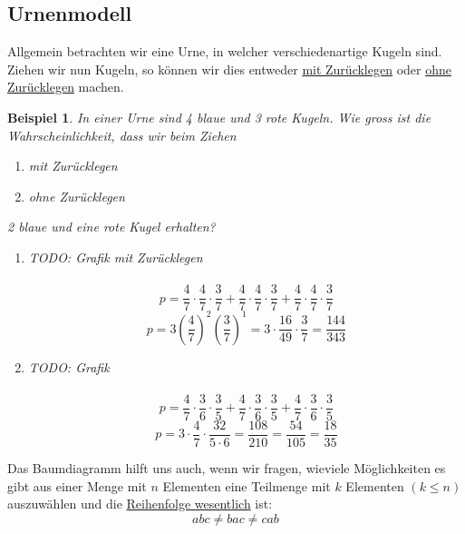 \documentclass{report}
\newtheorem{myexample}{Beispiel}
\begin{document}
\subsection{Urnenmodell}
Allgemein betrachten wir eine Urne, in welcher verschiedenartige Kugeln sind. Ziehen wir nun Kugeln, so können wir dies entweder \underline{mit Zurücklegen} oder \underline{ohne Zurücklegen} machen.
\begin{myexample}
In einer Urne sind 4 blaue und 3 rote Kugeln. Wie gross ist die Wahrscheinlichkeit, dass wir beim Ziehen
\begin{enumerate}
\item
mit Zurücklegen
\item
ohne Zurücklegen
\end{enumerate}
2 blaue und eine rote Kugel erhalten?
\begin{enumerate}
\item
TODO: Grafik mit Zurücklegen\\\\
\begin{equation}
p = \frac{4}{7} \cdot \frac{4}{7} \cdot \frac{3}{7} + \frac{4}{7} \cdot \frac{4}{7} \cdot \frac{3}{7} + \frac{4}{7} \cdot \frac{4}{7} \cdot \frac{3}{7}
\end{equation}
\begin{equation}
p = 3 (\frac{4}{7})^2(\frac{3}{7})^1 = 3 \cdot \frac{16}{49} \cdot \frac{3}{7} = \frac{144}{343}
\end{equation}
\item
TODO: Grafik\\\\
\begin{equation}
p = \frac{4}{7} \cdot \frac{3}{6} \cdot \frac{3}{5} + \frac{4}{7} \cdot \frac{3}{6} \cdot \frac{3}{5} +\frac{4}{7} \cdot \frac{3}{6} \cdot \frac{3}{5}
\end{equation}
\begin{equation}
p = 3 \cdot \frac{4}{7} \cdot \frac{32}{5 \cdot 6} = \frac{108}{210} = \frac{54}{105} = \frac{18}{35}
\end{equation}
\end{enumerate}
\end{myexample}
Das Baumdiagramm hilft uns auch, wenn wir fragen, wieviele Möglichkeiten es gibt aus einer Menge mit $n$ Elementen eine Teilmenge mit $k$ Elementen $(k \leq n)$ auszuwählen und die \underline{Reihenfolge wesentlich} ist:
\begin{equation}
abc \neq bac \neq cab
\end{equation}
\end{document}
